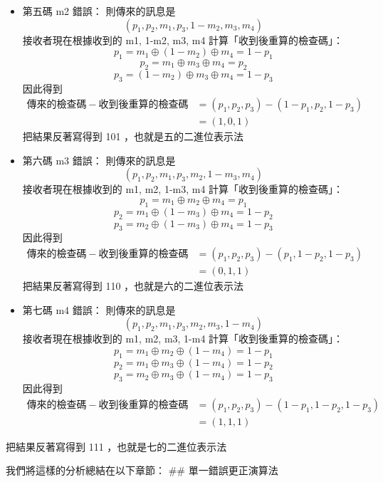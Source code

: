 \documentclass[
]{article}
\begin{document}
\begin{itemize}
\item
  第五碼 m2 錯誤： 則傳來的訊息是 \[
  (p_{1},p_{2},m_{1},p_{3},1-m_{2},m_{3},m_{4})
  \] 接收者現在根據收到的 m1, 1-m2, m3, m4 計算「收到後重算的檢查碼」：
  \[
  p_{1} = m_{1}\oplus (1-m_{2})\oplus m_{4}
  = 1-p_{1}
  \] \[
  p_{2} = m_{1}\oplus m_{3}\oplus m_{4}=p_{2}
  \] \[
  p_{3} = (1-m_{2})\oplus m_{3}\oplus m_{4}=1-p_{3}
  \] 因此得到 \[
  \begin{aligned}
  傳來的檢查碼 - 收到後重算的檢查碼 &= (p_{1},p_{2},p_{3}) - (1-p_{1},p_{2},1-p_{3}) \\
  &= (1,0,1)
  \end{aligned}
  \] 把結果反著寫得到 101 ，也就是五的二進位表示法
\item
  第六碼 m3 錯誤： 則傳來的訊息是 \[
  (p_{1},p_{2},m_{1},p_{3},m_{2},1-m_{3},m_{4})
  \] 接收者現在根據收到的 m1, m2, 1-m3, m4 計算「收到後重算的檢查碼」：
  \[
  p_{1} = m_{1}\oplus m_{2}\oplus m_{4}
  = p_{1}
  \] \[
  p_{2} = m_{1}\oplus (1-m_{3})\oplus m_{4}=1-p_{2}
  \] \[
  p_{3} = m_{2}\oplus (1-m_{3})\oplus m_{4}=1-p_{3}
  \] 因此得到 \[
  \begin{aligned}
  傳來的檢查碼 - 收到後重算的檢查碼 &= (p_{1},p_{2},p_{3}) - (p_{1},1-p_{2},1-p_{3}) \\
  &= (0,1,1)
  \end{aligned}
  \] 把結果反著寫得到 110 ，也就是六的二進位表示法
\item
  第七碼 m4 錯誤： 則傳來的訊息是 \[
  (p_{1},p_{2},m_{1},p_{3},m_{2},m_{3},1-m_{4})
  \] 接收者現在根據收到的 m1, m2, m3, 1-m4 計算「收到後重算的檢查碼」：
  \[
  p_{1} = m_{1}\oplus m_{2}\oplus (1-m_{4})
  = 1-p_{1}
  \] \[
  p_{2} = m_{1}\oplus m_{3}\oplus (1-m_{4})=1-p_{2}
  \] \[
  p_{3} = m_{2}\oplus m_{3}\oplus(1-m_{4})=1-p_{3}
  \] 因此得到 \[
  \begin{aligned}
  傳來的檢查碼 - 收到後重算的檢查碼 &= (p_{1},p_{2},p_{3}) - (1-p_{1},1-p_{2},1-p_{3}) \\
  &= (1,1,1)
  \end{aligned}
  \]
\end{itemize}

把結果反著寫得到 111 ，也就是七的二進位表示法

我們將這樣的分析總結在以下章節： \#\# 單一錯誤更正演算法
\end{document}
